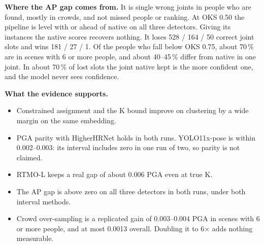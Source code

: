 \documentclass[11pt,a4paper]{article}
\begin{document}
\textbf{Where the AP gap comes from.}
It is single wrong joints in people who are found, mostly in crowds, and not missed people or ranking.
At OKS 0.50 the pipeline is level with or ahead of native on all three detectors.
Giving its instances the native scores recovers nothing.
It loses 528 / 164 / 50 correct joint slots and wins 181 / 27 / 1.
Of the people who fall below OKS 0.75, about 70\,\% are in scenes with 6 or more people,
and about 40--45\,\% differ from native in one joint.
In about 70\,\% of lost slots the joint native kept is the more confident one, and the model never sees confidence.

\textbf{What the evidence supports.}
\begin{itemize}
    \item Constrained assignment and the K bound improve on clustering by a wide margin on the same embedding.
    \item PGA parity with HigherHRNet holds in both runs.
    YOLO11x-pose is within 0.002--0.003: its interval includes zero in one run of two, so parity is not claimed.
    \item RTMO-L keeps a real gap of about 0.006 PGA even at true K.
    \item The AP gap is above zero on all three detectors in both runs, under both interval methods.
    \item Crowd over-sampling is a replicated gain of 0.003--0.004 PGA in scenes with 6 or more people, and at most
    0.0013 overall.
    Doubling it to 6$\times$ adds nothing measurable.
\end{itemize}
\end{document}
